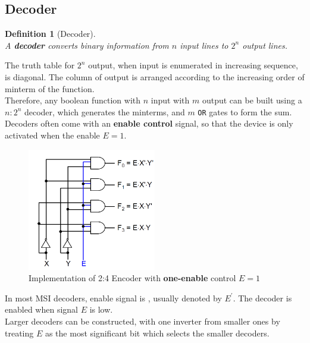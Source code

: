 \documentclass[12pt]{article}
\newtheorem{definition}{Definition}[section]
\theoremstyle{definition}
\begin{document}
\subsection{Decoder}
\begin{definition}[Decoder]
\hfill\\\normalfont A \textbf{decoder} converts binary information from $n$ input lines to $2^n$ output lines.
\end{definition}
The truth table for $2^n$ output, when input is enumerated in increasing sequence, is diagonal. The column of output is arranged according to the increasing order of minterm of the function.\\

Therefore, any boolean function with $n$ input with $m$ output can be built using a $n:2^n$ decoder, which generates the minterms, and $m$ \texttt{OR} gates to form the sum.\\

Decoders often come with an \textbf{enable control} signal, so that the device is only activated when the enable $E = 1$. \\
\begin{figure}[h]
\centering
\includegraphics[width = 0.5\textwidth]{7_1.png}
\caption{Implementation of 2:4 Encoder with \textbf{one-enable} control $E=1$}
\end{figure}
In most MSI decoders, enable signal is , usually denoted by $E^\prime$. The decoder is enabled when signal $E$ is low.\\

Larger decoders can be constructed, with one inverter from smaller ones by treating $E$ as the most significant bit which selects the smaller decoders.
\end{document}
